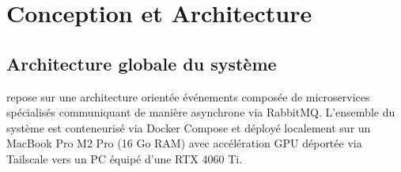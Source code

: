 \chapter{Conception et Architecture}

\section{Architecture globale du système}

\insureflow{} repose sur une architecture orientée événements composée
de microservices spécialisés communiquant de manière asynchrone via RabbitMQ.
L'ensemble du système est conteneurisé via Docker Compose et déployé localement
sur un MacBook Pro M2 Pro (16 Go RAM) avec accélération GPU déportée via Tailscale
vers un PC équipé d'une RTX 4060 Ti.

